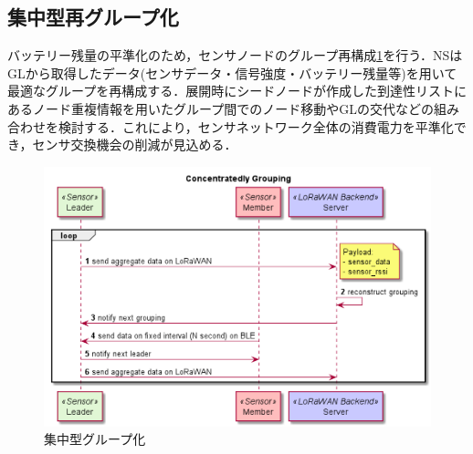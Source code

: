 \subsection{集中型再グループ化}
バッテリー残量の平準化のため，センサノードのグループ再構成\ref{fig:group_reconstruction_concentrately}を行う．NSはGLから取得したデータ(センサデータ・信号強度・バッテリー残量等)を用いて最適なグループを再構成する．展開時にシードノードが作成した到達性リストにあるノード重複情報を用いたグループ間でのノード移動やGLの交代などの組み合わせを検討する．これにより，センサネットワーク全体の消費電力を平準化でき，センサ交換機会の削減が見込める．

\begin{figure}[]
    \begin{center}
    \includegraphics[width=14cm]{figures/グループ化_集中的.png}
    \caption{集中型グループ化}
    \label{fig:group_reconstruction_concentrately}
    \end{center}
\end{figure}